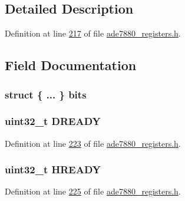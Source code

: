 \subsection{Detailed Description}


Definition at line \hyperlink{a00036_source_l00217}{217} of file \hyperlink{a00036_source}{ade7880\-\_\-registers.\-h}.



\subsection{Field Documentation}
\hypertarget{a00032_a16a3d2bba55a06488b87f0c7f9c00887}{
\subsubsection[{bits}]{\setlength{\rightskip}{0pt plus 5cm}struct \{ ... \}  bits}}\label{dc/d87/a00032_a16a3d2bba55a06488b87f0c7f9c00887}
\hypertarget{a00032_addffbfdbfb43bcbc4893718495e12d8b}{
\subsubsection[{D\-R\-E\-A\-D\-Y}]{\setlength{\rightskip}{0pt plus 5cm}uint32\-\_\-t D\-R\-E\-A\-D\-Y}}\label{dc/d87/a00032_addffbfdbfb43bcbc4893718495e12d8b}


Definition at line \hyperlink{a00036_source_l00223}{223} of file \hyperlink{a00036_source}{ade7880\-\_\-registers.\-h}.

\hypertarget{a00032_abe9d0514a4b0619dd17737e16f9018a0}{
\subsubsection[{H\-R\-E\-A\-D\-Y}]{\setlength{\rightskip}{0pt plus 5cm}uint32\-\_\-t H\-R\-E\-A\-D\-Y}}\label{dc/d87/a00032_abe9d0514a4b0619dd17737e16f9018a0}


Definition at line \hyperlink{a00036_source_l00225}{225} of file \hyperlink{a00036_source}{ade7880\-\_\-registers.\-h}.

